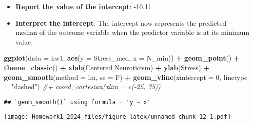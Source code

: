 \documentclass[
]{article}
\newenvironment{Shaded}{\begin{snugshade}}{\end{snugshade}}
\newcommand{\AttributeTok}[1]{\textcolor[rgb]{0.13,0.29,0.53}{#1}}
\newcommand{\CommentTok}[1]{\textcolor[rgb]{0.56,0.35,0.01}{\textit{#1}}}
\newcommand{\DecValTok}[1]{\textcolor[rgb]{0.00,0.00,0.81}{#1}}
\newcommand{\FunctionTok}[1]{\textcolor[rgb]{0.13,0.29,0.53}{\textbf{#1}}}
\newcommand{\NormalTok}[1]{#1}
\newcommand{\SpecialCharTok}[1]{\textcolor[rgb]{0.81,0.36,0.00}{\textbf{#1}}}
\newcommand{\StringTok}[1]{\textcolor[rgb]{0.31,0.60,0.02}{#1}}
\begin{document}
\begin{itemize}
\item
  \textbf{Report the value of the intercept}: -10.11
\item
  \textbf{Interpret the intercept}: The intercept now represents the
  predicted median of the outcome variable when the predictor variable
  is at its minimum value.
\end{itemize}

\begin{Shaded}
\begin{Highlighting}[]
\FunctionTok{ggplot}\NormalTok{(}\AttributeTok{data =}\NormalTok{ hw1, }\FunctionTok{aes}\NormalTok{(}\AttributeTok{y =}\NormalTok{ Stress\_med, }\AttributeTok{x =}\NormalTok{ N\_min)) }\SpecialCharTok{+}
  \FunctionTok{geom\_point}\NormalTok{() }\SpecialCharTok{+}
  \FunctionTok{theme\_classic}\NormalTok{() }\SpecialCharTok{+}
  \FunctionTok{xlab}\NormalTok{(}\StringTok{\textquotesingle{}Centered Neuroticism\textquotesingle{}}\NormalTok{) }\SpecialCharTok{+}
  \FunctionTok{ylab}\NormalTok{(}\StringTok{\textquotesingle{}Stress\textquotesingle{}}\NormalTok{) }\SpecialCharTok{+}
  \FunctionTok{geom\_smooth}\NormalTok{(}\AttributeTok{method =} \StringTok{\textquotesingle{}lm\textquotesingle{}}\NormalTok{, }\AttributeTok{se =}\NormalTok{ F) }\SpecialCharTok{+}
  \FunctionTok{geom\_vline}\NormalTok{(}\AttributeTok{xintercept =} \DecValTok{0}\NormalTok{, }\AttributeTok{linetype =} \StringTok{"dashed"}\NormalTok{) }\CommentTok{\#+ coord\_cartesian(xlim = c({-}25, 35))}
\end{Highlighting}
\end{Shaded}

\begin{verbatim}
## `geom_smooth()` using formula = 'y ~ x'
\end{verbatim}

\texttt{[image: Homework1\_2024\_files/figure-latex/unnamed-chunk-12-1.pdf]}
\end{document}
